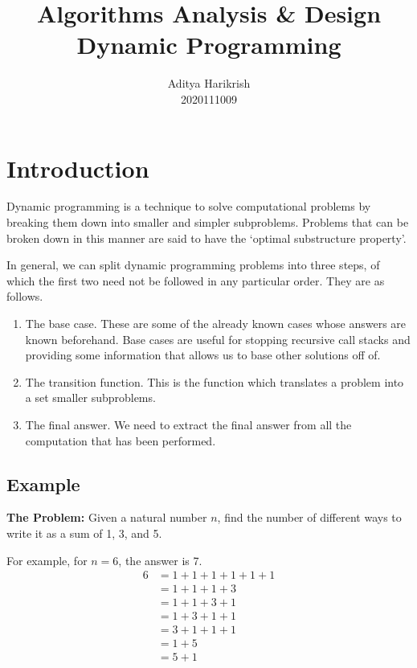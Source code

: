 \documentclass[12pt, a4paper]{article}
\title{Algorithms Analysis \& Design\\Dynamic Programming}
\author{Aditya Harikrish\\2020111009}
\date{}
\theoremstyle{definition}
\theoremstyle{remark}
\begin{document}
\maketitle
\tableofcontents
\newpage

\section{Introduction}
Dynamic programming is a technique to solve computational problems by breaking them down into smaller and simpler subproblems. Problems that can be broken down in this manner are said to have the `optimal substructure property'.

In general, we can split dynamic programming problems into three steps, of which the first two need not be followed in any particular order. They are as follows.
\begin{enumerate}
    \item The base case. These are some of the already known cases whose answers are known beforehand. Base cases are useful for stopping recursive call stacks and providing some information that allows us to base other solutions off of.
    \item The transition function. This is the function which translates a problem into a set smaller subproblems.
    \item The final answer. We need to extract the final answer from all the computation that has been performed.
\end{enumerate}

\subsection{Example}
\begin{tcolorbox}
    \textbf{The Problem:} Given a natural number $n$, find the number of different ways to write it as a sum of 1, 3, and 5.
\end{tcolorbox}
For example, for $n = 6$, the answer is 7.
\begin{equation*}
    \begin{split}
        6 &= 1+1+1+1+1+1 \\
        &= 1+1+1+3\\
        &= 1+1+3+1\\
        &= 1+3+1+1\\
        &= 3+1+1+1\\
        &=1+5\\
        &= 5+1
    \end{split}
\end{equation*}
\end{document}
